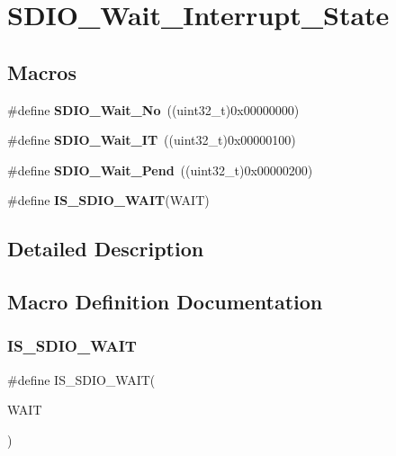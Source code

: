 \section{S\+D\+I\+O\+\_\+\+Wait\+\_\+\+Interrupt\+\_\+\+State}
\label{group__SDIO__Wait__Interrupt__State}
\subsection*{Macros}
\begin{DoxyCompactItemize}
\item 
\#define \textbf{ S\+D\+I\+O\+\_\+\+Wait\+\_\+\+No}~((uint32\+\_\+t)0x00000000)
\item 
\#define \textbf{ S\+D\+I\+O\+\_\+\+Wait\+\_\+\+IT}~((uint32\+\_\+t)0x00000100)
\item 
\#define \textbf{ S\+D\+I\+O\+\_\+\+Wait\+\_\+\+Pend}~((uint32\+\_\+t)0x00000200)
\item 
\#define \textbf{ I\+S\+\_\+\+S\+D\+I\+O\+\_\+\+W\+A\+IT}(W\+A\+IT)
\end{DoxyCompactItemize}


\subsection{Detailed Description}


\subsection{Macro Definition Documentation}
\mbox{\label{group__SDIO__Wait__Interrupt__State_ga7ee5c289c8e06a76b849808d15b03810}} 
\subsubsection{I\+S\+\_\+\+S\+D\+I\+O\+\_\+\+W\+A\+IT}
{\footnotesize\ttfamily \#define I\+S\+\_\+\+S\+D\+I\+O\+\_\+\+W\+A\+IT(\begin{DoxyParamCaption}\item[{}]{W\+A\+IT }\end{DoxyParamCaption})}

